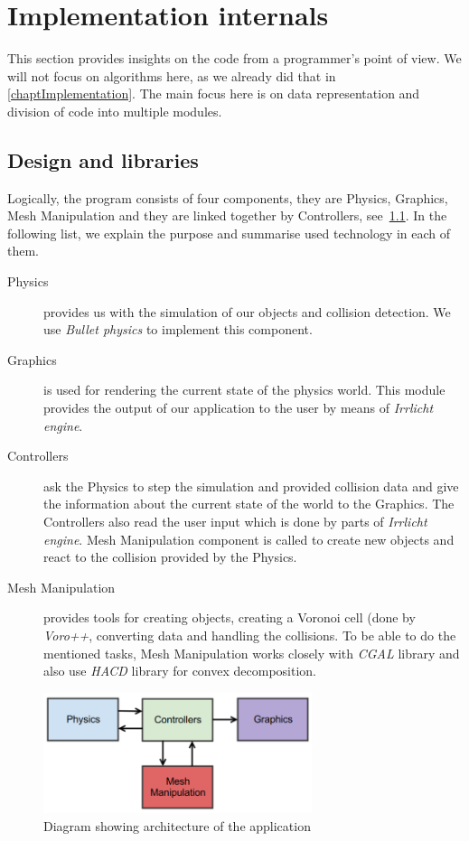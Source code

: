 \chapter{Implementation internals}
\label{app:implementation}

This section provides insights on the code from a programmer's point of view. We will not focus on algorithms here, as we already did that in \cref{chaptImplementation}. The main focus here is on data representation and division of code into multiple modules.

\section{Design and libraries}
Logically, the program consists of four components, they are Physics, Graphics, Mesh Manipulation and they are linked together by Controllers, see~\cref{fig:architecture}. In the following list, we explain the purpose and summarise used technology in each of them.
\begin{description}
\item[Physics] provides us with the simulation of our objects and collision detection. We use \emph{Bullet physics} to implement this component. 
\item[Graphics] is used for rendering the current state of the physics world. This module provides the output of our application to the user by means of \emph{Irrlicht engine}.
\item[Controllers] ask the Physics to step the simulation and provided collision data and give the information about the current state of the world to the Graphics. The Controllers also read the user input which is done by parts of \emph{Irrlicht engine}. Mesh Manipulation component is called to create new objects and react to the collision provided by the Physics.
\item[Mesh Manipulation] provides tools for creating objects, creating a Voronoi cell (done by \emph{Voro++}, converting data and handling the collisions. To be able to do the mentioned tasks, Mesh Manipulation works closely with \emph{CGAL} library and also use \emph{HACD} library for convex decomposition.
\end{description}

\begin{figure}
        \centering
        \includegraphics[width=0.7\textwidth]{img/architecture}
        \caption{Diagram showing architecture of the application}
        \label{fig:architecture}
\end{figure}

